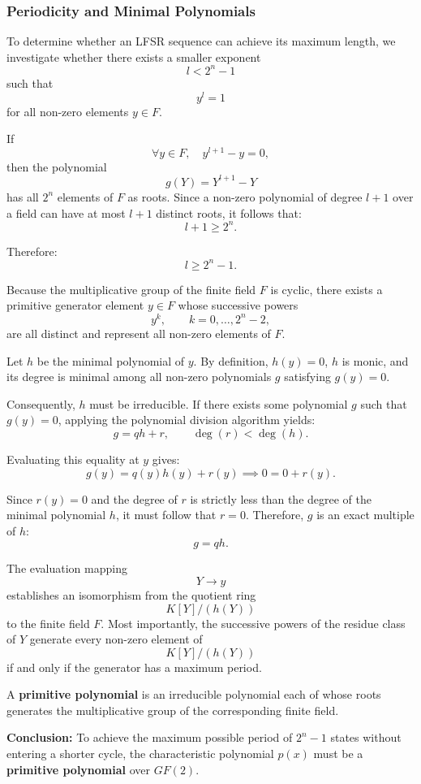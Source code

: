 \subsubsection{Periodicity and Minimal Polynomials}

To determine whether an LFSR sequence can achieve its maximum length, we investigate whether there exists a smaller exponent
\[
l<2^n-1
\]
such that
\[
y^l=1
\]
for all non-zero elements $y\in F$.

If
\[
\forall y\in F,\quad y^{l+1}-y=0,
\]
then the polynomial
\[
g(Y)=Y^{l+1}-Y
\]
has all $2^n$ elements of $F$ as roots. Since a non-zero polynomial of degree $l+1$ over a field can have at most $l+1$ distinct roots, it follows that:
\[
l+1\geq 2^n.
\]

Therefore:
\[
l\geq 2^n-1.
\]

Because the multiplicative group of the finite field $F$ is cyclic, there exists a primitive generator element $y\in F$ whose successive powers
\[
y^k,\qquad k=0,\dots,2^n-2,
\]
are all distinct and represent all non-zero elements of $F$.

Let $h$ be the minimal polynomial of $y$. By definition, $h(y)=0$, $h$ is monic, and its degree is minimal among all non-zero polynomials $g$ satisfying $g(y)=0$.

Consequently, $h$ must be irreducible. If there exists some polynomial $g$ such that $g(y)=0$, applying the polynomial division algorithm yields:
\[
g=qh+r,
\qquad
\deg(r)<\deg(h).
\]

Evaluating this equality at $y$ gives:
\[
g(y)=q(y)h(y)+r(y)
\implies
0=0+r(y).
\]

Since $r(y)=0$ and the degree of $r$ is strictly less than the degree of the minimal polynomial $h$, it must follow that $r=0$. Therefore, $g$ is an exact multiple of $h$:
\[
g=qh.
\]

The evaluation mapping
\[
Y\rightarrow y
\]
establishes an isomorphism from the quotient ring
\[
K[Y]/(h(Y))
\]
to the finite field $F$. Most importantly, the successive powers of the residue class of $Y$ generate every non-zero element of
\[
K[Y]/(h(Y))
\]
if and only if the generator has a maximum period.

\begin{definition}
A \textbf{primitive polynomial} is an irreducible polynomial each of whose roots generates the multiplicative group of the corresponding finite field.
\end{definition}

\textbf{Conclusion:} To achieve the maximum possible period of $2^n-1$ states without entering a shorter cycle, the characteristic polynomial $p(x)$ must be a \textbf{primitive polynomial} over $GF(2)$.

